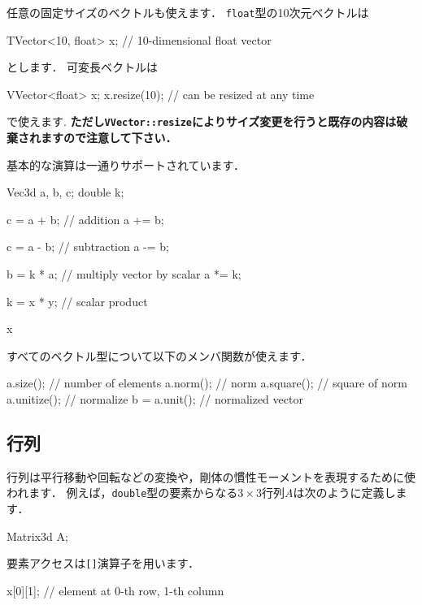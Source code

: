 \KLUDGE 任意の固定サイズのベクトルも使えます．
\texttt{float}型の10次元ベクトルは
\begin{sourcecode}
TVector<10, float> x;    // 10-dimensional float vector
\end{sourcecode}
\KLUDGE とします．
\KLUDGE 可変長ベクトルは
\begin{sourcecode}
VVector<float> x;
x.resize(10);            // can be resized at any time
\end{sourcecode}
\KLUDGE で使えます.
\textbf{ただし\texttt{VVector::resize}によりサイズ変更を行うと既存の内容は破棄されますので注意して下さい．}

\KLUDGE 基本的な演算は一通りサポートされています．
\begin{sourcecode}
Vec3d a, b, c;
double k;

c = a + b;               // addition
a += b;

c = a - b;               // subtraction
a -= b;

b = k * a;               // multiply vector by scalar
a *= k;

k = x * y;               // scalar product

x %
\end{sourcecode}

\KLUDGE すべてのベクトル型について以下のメンバ関数が使えます．
\begin{sourcecode}
a.size();                // number of elements
a.norm();                // norm
a.square();              // square of norm
a.unitize();             // normalize
b = a.unit();            // normalized vector
\end{sourcecode}


\subsection*{行列}


\KLUDGE 行列は平行移動や回転などの変換や，剛体の慣性モーメントを表現するために使われます．
\KLUDGE 例えば，\texttt{double}型の要素からなる$3 \times 3$行列$A$は次のように定義します．
\begin{sourcecode}
Matrix3d A;
\end{sourcecode}

\KLUDGE 要素アクセスは\texttt{[]}演算子を用います．
\begin{sourcecode}
x[0][1];    // element at 0-th row, 1-th column
\end{sourcecode}

